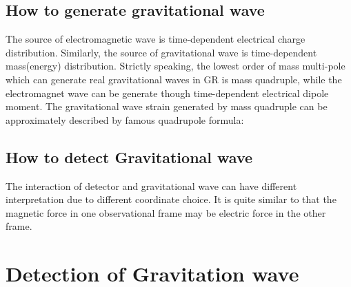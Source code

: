 


\subsection{How to generate gravitational wave}
The source of electromagnetic wave is time-dependent electrical charge distribution.  Similarly, the source of gravitational wave is time-dependent mass(energy) distribution. Strictly speaking, the lowest order of mass multi-pole which can generate real gravitational waves in GR is mass quadruple, while the electromagnet wave can be generate though time-dependent electrical dipole moment. The gravitational wave strain generated by mass quadruple can be approximately described by famous quadrupole formula:
\subsection{How to detect Gravitational wave}
The interaction of detector and gravitational wave can have different interpretation due to different coordinate choice\cite{ifo:gauge}. It is quite similar to that the magnetic force in one observational frame may be electric force in the other frame. 


\section{Detection of Gravitation wave}




